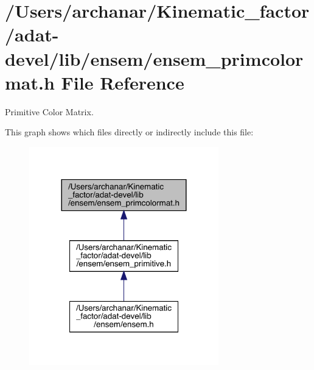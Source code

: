 \hypertarget{adat-devel_2lib_2ensem_2ensem__primcolormat_8h}{}\section{/\+Users/archanar/\+Kinematic\+\_\+factor/adat-\/devel/lib/ensem/ensem\+\_\+primcolormat.h File Reference}
\label{adat-devel_2lib_2ensem_2ensem__primcolormat_8h}


Primitive Color Matrix.  


This graph shows which files directly or indirectly include this file\+:
\nopagebreak
\begin{figure}[H]
\begin{center}
\leavevmode
\includegraphics[width=233pt]{d1/d18/adat-devel_2lib_2ensem_2ensem__primcolormat_8h__dep__incl}
\end{center}
\end{figure}
